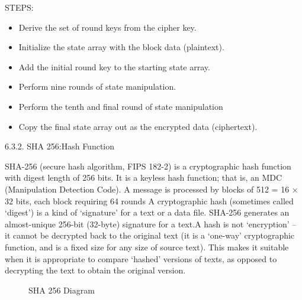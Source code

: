 \documentclass[oneside,a4paper,12pt]{report}
\begin{document}
{STEPS:\newline

\begin{itemize}


\item Derive the set of round keys from the cipher key.\newline
\item Initialize the state array with the block data (plaintext).\newline
\item Add the initial round key to the starting state array.\newline
\item Perform nine rounds of state manipulation.\newline
\item Perform the tenth and final round of state manipulation\newline
\item Copy the final state array out as the encrypted data (ciphertext).\newline
\end{itemize}

6.3.2.  SHA 256:Hash Function\newline

SHA-256 (secure hash algorithm, FIPS 182-2) is a cryptographic hash function with digest length of 256 bits. It is a keyless hash function; that is, an MDC (Manipulation Detection Code). A message is processed by blocks of 512 = 16 × 32 bits, each block requiring 64 rounds
A cryptographic hash (sometimes called ‘digest’) is a kind of ‘signature’ for a text or a data file. SHA-256 generates an almost-unique 256-bit (32-byte) signature for a text.A hash is not ‘encryption’ – it cannot be decrypted back to the original text (it is a ‘one-way’ cryptographic function, and is a fixed size for any size of source text). 
This makes it suitable when it is appropriate to compare ‘hashed’ versions of texts, as opposed to decrypting the text to obtain the original version.

\begin{center}
	\begin{figure}[!htbp]
		\centering
	    \caption{SHA 256 Diagram}
	    \label{fig:SHA 256 Diagram}
	\end{figure}
\end{center}


}
\end{document}
